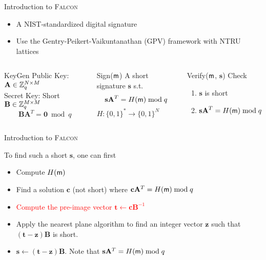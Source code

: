 \begin{frame}{Introduction to \textsc{Falcon}}

\begin{itemize}
    \item A NIST-standardized digital signature
    \item Use the Gentry-Peikert-Vaikuntanathan (GPV) framework \cite{STOC:GenPeiVai08} with NTRU lattices
\end{itemize}
\medskip
\begin{columns}[T]

\begin{block}{KeyGen}
Public Key: $\mathbf{A} \in \mathbb{Z}^{N \times M}_q$\\
Secret Key: Short $\mathbf{B} \in \mathbb{Z}_q^{M \times M}$
\vskip -10pt
\[ \mathbf{BA}^T = \mathbf{0} \bmod q \]
\end{block}

\begin{block}{Sign(${\sf m}$)}
A short signature $\mathbf{s}$ s.t.
\vskip -22pt
\[ \mathbf{sA}^T = H({\sf m}) \bmod q \]
\vskip -8pt
$H:\{0,1\}^* \to \{0,1\}^N$
\end{block}

\begin{block}{Verify(${\sf m}$, $\mathbf{s}$)}
Check
\begin{enumerate}
    \item $\mathbf{s}$ is short
    \item $\mathbf{sA}^T = H({\sf m}) \bmod q$
\end{enumerate}
\end{block}

\end{columns}
    
\end{frame}

\begin{frame}{Introduction to \textsc{Falcon}}

To find such a short $\mathbf{s}$, one can first
\pause
\begin{itemize}
    \item Compute $H({\sf m})$
    \pause
    \item Find a solution $\mathbf{c}$ (not short) where $\mathbf{c}\mathbf{A}^T = H({\sf m}) \bmod q$
    \pause
    \item \textcolor<7>{red}{Compute the pre-image vector $\mathbf{t} \gets \mathbf{c}\mathbf{B}^{-1}$}
    \pause
    \item Apply the nearest plane algorithm to find an integer vector $\mathbf{z}$ such that $\mathbf{(t-z)B}$ is short.
    \pause
    \item $\mathbf{s} \gets \mathbf{(t-z)B}$. Note that $\mathbf{s}\mathbf{A}^T = H({\sf m}) \bmod q$
\end{itemize}

\end{frame}


